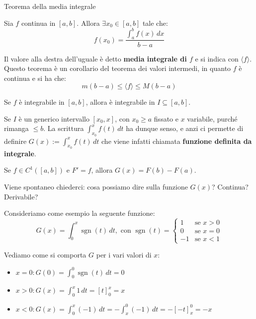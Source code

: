 \documentclass[12pt]{report}
\begin{document}
	\begin{teorema}{Teorema della media integrale}{}
		
		Sia $f$ continua in $[a, b]$. Allora $\exists x_0 \in [a, b]$ tale che:
		\[
		f(x_0) = \frac{\int_{a}^{b} f(x) \, dx}{b - a}
		\]
		
	\end{teorema}
	
	Il valore alla destra dell'uguale è detto \textbf{media integrale di $f$} e si indica con $\langle f \rangle$.
	Questo teorema è un corollario del teorema dei valori intermedi, in quanto $f$ è continua e si ha che:
	\[
	m(b - a) \leq \langle f \rangle \leq M(b - a)
	\]
	
	\begin{osservazione}{}{}
		
		Se $f$ è integrabile in $[a, b]$, allora è integrabile in $I \subseteq [a, b]$.
		
		Se $I$ è un generico intervallo $[x_0, x]$, con $x_0 \ge a$ fissato e $x$ variabile, purché rimanga $\le b$.
		La scrittura $\int_{x_0}^x f(t) \, dt$ ha dunque senso, e anzi ci permette di definire $G(x) := \int_{x_0}^x f(t) \, dt$ che viene infatti chiamata \textbf{funzione definita da integrale}.
		
	\end{osservazione}
	
	\begin{osservazione}{}{}
		
		Se $f \in C^1([a, b])$ e $F' = f$, allora $G(x) = F(b) - F(a)$.
		
	\end{osservazione}
	
	Viene spontaneo chiederci: cosa possiamo dire sulla funzione $G(x)$? Continua? Derivabile?
	
	Consideriamo come esempio la seguente funzione:
	\[
	G(x) = \int_0^x \operatorname{sgn}(t) \, dt, \text{ con } \operatorname{sgn}(t) = \begin{cases} 1 & \text{se } x > 0 \\ 0 & \text{se } x = 0 \\ -1 & \text{se } x < 1 \end{cases}
	\]
	
	Vediamo come si comporta $G$ per i vari valori di $x$:
	\begin{itemize}
		
		\item $x = 0 \colon G(0) = \int_0^0 \operatorname{sgn}(t) \, dt = 0$
		
		\item $x > 0 \colon G(x) = \int_0^x 1 \, dt = [t]_0^x = x$
		
		\item $x < 0 \colon G(x) = \int_0^x (-1) \, dt = -\int_x^0 (-1) \, dt = -[-t]_x^0 = -x$
		
	\end{itemize}
	
\end{document}
